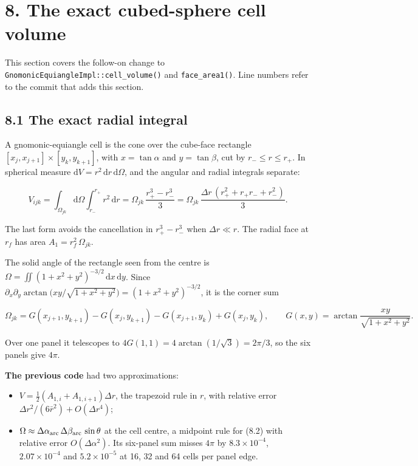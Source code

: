\documentclass[11pt,a4paper]{article}
\begin{document}
\section*{8. The exact cubed-sphere cell volume}

This section covers the follow-on change to \texttt{GnomonicEquiangleImpl::cell\_volume()} and
\texttt{face\_area1()}. Line numbers refer to the commit that adds this section.

\subsection*{8.1 The exact radial integral}

A gnomonic-equiangle cell is the cone over the cube-face rectangle
$[x_j, x_{j+1}]\times[y_k, y_{k+1}]$, with $x=\tan\alpha$ and $y=\tan\beta$, cut by
$r_- \le r \le r_+$. In spherical measure $\mathrm{d}V = r^2\,\mathrm{d}r\,\mathrm{d}\Omega$, and the
angular and radial integrals separate:

\begin{equation*}
V_{ijk} = \int_{\Omega_{jk}}\!\mathrm{d}\Omega\int_{r_-}^{r_+} r^2\,\mathrm{d}r
        = \Omega_{jk}\,\frac{r_+^3-r_-^3}{3}
        = \Omega_{jk}\,\frac{\Delta r\,(r_+^2+r_+r_-+r_-^2)}{3}. \tag{8.1}
\end{equation*}

The last form avoids the cancellation in $r_+^3-r_-^3$ when $\Delta r\ll r$. The radial face at
$r_f$ has area $A_1 = r_f^2\,\Omega_{jk}$.

The solid angle of the rectangle seen from the centre is
$\Omega=\iint (1+x^2+y^2)^{-3/2}\,\mathrm{d}x\,\mathrm{d}y$. Since
$\partial_x\partial_y\arctan\!\big(xy/\sqrt{1+x^2+y^2}\big) = (1+x^2+y^2)^{-3/2}$, it is the corner sum

\begin{equation*}
\Omega_{jk} = G(x_{j+1},y_{k+1}) - G(x_j,y_{k+1}) - G(x_{j+1},y_k) + G(x_j,y_k),\qquad
G(x,y)=\arctan\frac{xy}{\sqrt{1+x^2+y^2}}. \tag{8.2}
\end{equation*}

Over one panel it telescopes to $4G(1,1)=4\arctan(1/\sqrt3)=2\pi/3$, so the six panels give $4\pi$.

\textbf{The previous code} had two approximations:
\begin{itemize}
\item $V = \tfrac12(A_{1,i}+A_{1,i+1})\Delta r$, the trapezoid rule in $r$, with relative error
  $\Delta r^2/(6\bar r^2)+O(\Delta r^4)$;
\item $\Omega\approx\Delta\alpha_{\rm arc}\,\Delta\beta_{\rm arc}\,\sin\theta$ at the cell centre, a
  midpoint rule for (8.2) with relative error $O(\Delta\alpha^2)$. Its six-panel sum misses $4\pi$
  by $8.3\times10^{-4}$, $2.07\times10^{-4}$ and $5.2\times10^{-5}$ at 16, 32 and 64 cells per panel edge.
\end{itemize}
\end{document}

